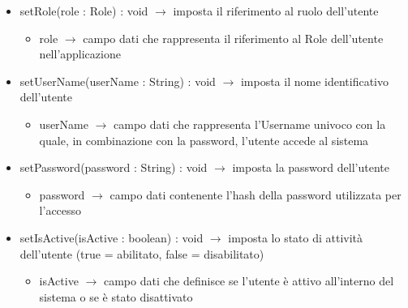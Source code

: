 \begin{description}
\begin{itemize}
	\item setRole(role : Role) : void $\rightarrow$ imposta il riferimento al ruolo dell'utente\begin{itemize}
		\item role $\rightarrow$ campo dati che rappresenta il riferimento al Role dell'utente nell'applicazione
	\end{itemize}
	
	\item setUserName(userName : String) : void $\rightarrow$ imposta il nome identificativo dell'utente\begin{itemize}
		\item userName $\rightarrow$ campo dati che rappresenta l'Username univoco con la quale, in combinazione con la password, l'utente accede al sistema
	\end{itemize}
	
	\item setPassword(password : String) : void $\rightarrow$ imposta la password dell'utente\begin{itemize}
		\item password $\rightarrow$ campo dati contenente l'hash della password utilizzata per l'accesso
	\end{itemize}
	
	\item setIsActive(isActive : boolean) : void $\rightarrow$ imposta lo stato di attività dell'utente (true = abilitato, false = disabilitato)\begin{itemize}
		\item isActive $\rightarrow$ campo dati che definisce se l'utente è attivo all'interno del sistema o se è stato disattivato
	\end{itemize}
	
\end{itemize}

\end{description}

\vspace{0.5cm}
\hypertarget{server::data::Answer}{}
